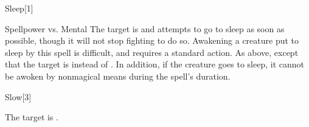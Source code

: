 \begin{spellsection}{Sleep}[1]
    \begin{spellheader}
    \end{spellheader}
    \begin{spellcontent}
        \begin{spelltargetinginfo}
        \end{spelltargetinginfo}
        \begin{spelleffects}
            \begin{spellattack}{Spellpower vs. Mental}
                \spellsuccess The target is \fatigued and attempts to go to sleep as soon as possible, though it will not stop fighting to do so. Awakening a creature put to sleep by this spell is difficult, and requires a standard action.
                \spellcritical As above, except that the target is \exhausted instead of \fatigued. In addition, if the creature goes to sleep, it cannot be awoken by nonmagical means during the spell's duration.
            \end{spellattack}
            \spelldur \durmed
        \end{spelleffects}
    \end{spellcontent}
    \begin{spellfooter}
        \miscastrandom
    \end{spellfooter}
    \begin{spellaugments}
    \end{spellaugments}
\end{spellsection}

\begin{spellsection}{Slow}[3]
    \begin{spellheader}
    \end{spellheader}
    \begin{spellcontent}
        \begin{spelltargetinginfo}
        \end{spelltargetinginfo}
        \begin{spelleffects}
            \spelleffect The target is \slowed.
            \spelldur \durbrief
        \end{spelleffects}
    \end{spellcontent}
    \begin{spellfooter}
        \miscastrandom
    \end{spellfooter}
    \begin{spellaugments}
    \end{spellaugments}
\end{spellsection}

